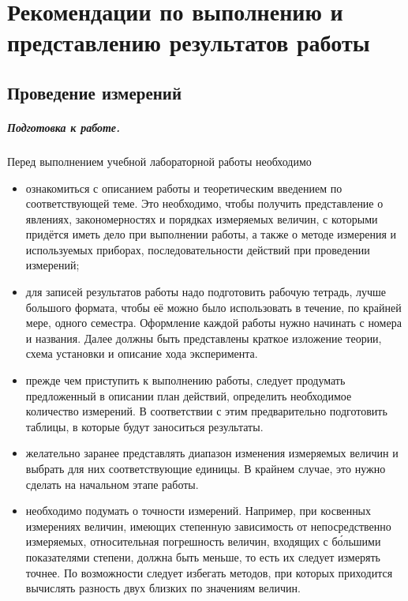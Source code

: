 \chapter{Рекомендации по выполнению и представлению результатов работы}

\section{Проведение измерений}

\paragraph{Подготовка к работе.}

Перед выполнением учебной лабораторной работы необходимо
\begin{itemize}
\item ознакомиться с описанием работы и теоретическим введением по соответствующей
теме. Это необходимо, чтобы получить представление о явлениях, закономерностях
и порядках измеряемых величин, с которыми придётся иметь дело при
выполнении работы, а также о методе измерения и используемых приборах,
последовательности действий при проведении измерений;
\item для записей результатов работы надо подготовить рабочую тетрадь, лучше
большого формата, чтобы её можно было использовать в течение, по крайней
мере, одного семестра. Оформление каждой работы нужно начинать с номера
и названия. Далее должны быть представлены краткое изложение теории,
схема установки и описание хода эксперимента.
\item прежде чем приступить к выполнению работы, следует продумать предложенный
в описании план действий, определить необходимое количество измерений.
В соответствии с этим предварительно подготовить таблицы, в которые
будут заноситься результаты. 
\item желательно заранее представлять диапазон изменения измеряемых величин
и выбрать для них соответствующие единицы. В крайнем случае, это нужно
сделать на начальном этапе работы. 
\item необходимо подумать о точности измерений. Например, при косвенных
измерениях величин, имеющих степенную зависимость от непосредственно
измеряемых, относительная погрешность величин, входящих с б\'{о}льшими
показателями степени, должна быть меньше, то есть их следует измерять
точнее. По возможности следует избегать методов, при которых приходится
вычислять разность двух близких по значениям величин.
\end{itemize}


